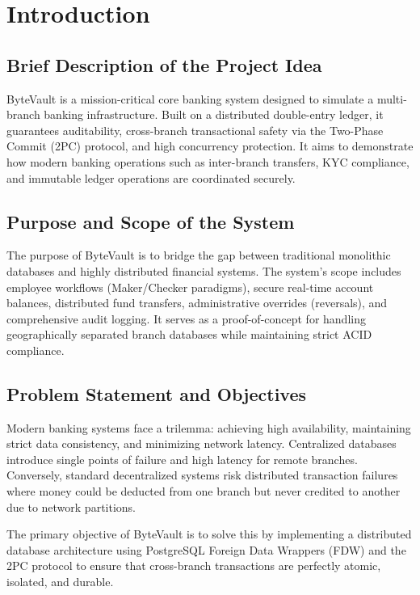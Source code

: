 \chapter{Introduction}

\section{Brief Description of the Project Idea}
ByteVault is a mission-critical core banking system designed to simulate a multi-branch banking infrastructure. Built on a distributed double-entry ledger, it guarantees auditability, cross-branch transactional safety via the Two-Phase Commit (2PC) protocol, and high concurrency protection. It aims to demonstrate how modern banking operations such as inter-branch transfers, KYC compliance, and immutable ledger operations are coordinated securely.

\section{Purpose and Scope of the System}
The purpose of ByteVault is to bridge the gap between traditional monolithic databases and highly distributed financial systems. The system's scope includes employee workflows (Maker/Checker paradigms), secure real-time account balances, distributed fund transfers, administrative overrides (reversals), and comprehensive audit logging. It serves as a proof-of-concept for handling geographically separated branch databases while maintaining strict ACID compliance.

\section{Problem Statement and Objectives}
Modern banking systems face a trilemma: achieving high availability, maintaining strict data consistency, and minimizing network latency. Centralized databases introduce single points of failure and high latency for remote branches. Conversely, standard decentralized systems risk distributed transaction failures where money could be deducted from one branch but never credited to another due to network partitions.

The primary objective of ByteVault is to solve this by implementing a distributed database architecture using PostgreSQL Foreign Data Wrappers (FDW) and the 2PC protocol to ensure that cross-branch transactions are perfectly atomic, isolated, and durable.
